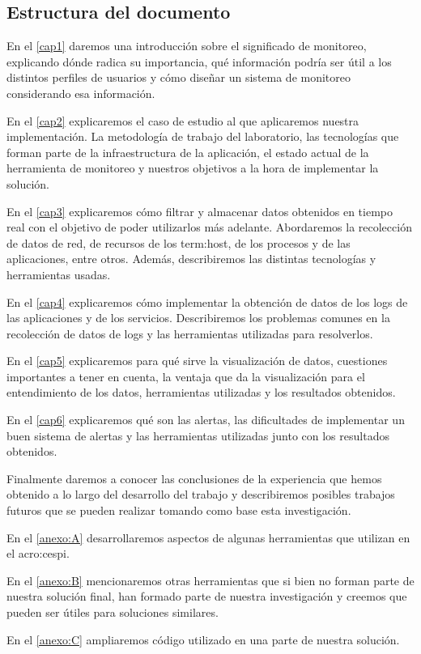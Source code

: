 \subsection{Estructura del documento}
\label{estructura}

En el \autoref{cap1} daremos una introducción sobre el significado de
monitoreo, explicando dónde radica su importancia, qué información podría ser
útil a los distintos perfiles de usuarios y cómo diseñar un sistema de
monitoreo considerando esa información.

En el \autoref{cap2} explicaremos el caso de estudio al que aplicaremos nuestra
implementación. La metodología de trabajo del laboratorio, las tecnologías que
forman parte de la infraestructura de la aplicación, el estado actual de la
herramienta de monitoreo y nuestros objetivos a la hora de implementar la
solución.

En el \autoref{cap3} explicaremos cómo filtrar y almacenar datos obtenidos en
tiempo real con el objetivo de poder utilizarlos más adelante. Abordaremos la
recolección de datos de red, de recursos de los \gls{term:host}, de los
procesos y de las aplicaciones, entre otros. Además, describiremos las
distintas tecnologías y herramientas usadas.

En el \autoref{cap4} explicaremos cómo implementar la obtención de datos de los
logs de las aplicaciones y de los servicios. Describiremos los problemas
comunes en la recolección de datos de logs y las herramientas utilizadas para
resolverlos.

En el \autoref{cap5} explicaremos para qué sirve la visualización de datos,
cuestiones importantes a tener en cuenta, la ventaja que da la visualización
para el entendimiento de los datos, herramientas utilizadas y los resultados
obtenidos.

En el \autoref{cap6} explicaremos qué son las alertas, las dificultades de
implementar un buen sistema de alertas y las herramientas utilizadas junto con
los resultados obtenidos.

Finalmente daremos a conocer las conclusiones de la experiencia que hemos
obtenido a lo largo del desarrollo del trabajo y describiremos posibles
trabajos futuros que se pueden realizar tomando como base esta investigación.

En el \autoref{anexo:A} desarrollaremos aspectos de algunas herramientas que
utilizan en el \gls{acro:cespi}.

En el \autoref{anexo:B} mencionaremos otras herramientas que si bien no forman
parte de nuestra solución final, han formado parte de nuestra investigación y
creemos que pueden ser útiles para soluciones similares.

En el \autoref{anexo:C} ampliaremos código utilizado en una parte de nuestra
solución.
